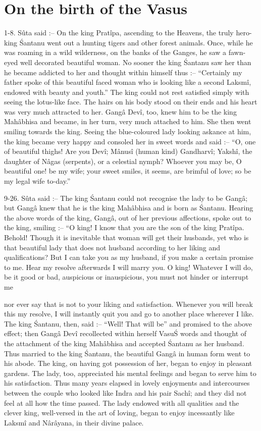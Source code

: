 ﻿\chapter{On the birth of the Vasus}

1-8. S\^uta said :-- On the king Prat\^ipa, ascending to the Heavens, the truly hero-king \'Santanu went out a hunting tigers and other forest animals. Once, while he was roaming in a wild wilderness, on the banks of the Ganges, he saw a fawn-eyed well decorated beautiful woman. No sooner the king \'Santanu saw her than he became addicted to her and thought within himself thus :-- ``Certainly my father spoke of this beautiful faced woman who is looking like a second Laksm\^i, endowed with beauty and youth.'' The king could not rest satisfied simply with seeing the lotus-like face. The hairs on his body stood on their ends and his heart was very much attracted to her. Gang\^a Dev\^i, too, knew him to be the king Mah\^abhisa and became, in her turn, very much attached to him. She then went smiling towards the king. Seeing the blue-coloured lady looking askance at him, the king became very happy and consoled her in sweet words and said :-- ``O, one of beautiful thighs! Are you Dev\^i; M\^anus\^i (human kind) Gandharv\^i; Yaksh\^i, the daughter of N\^agas (serpents), or a celestial nymph? Whoever you may be, O beautiful one! be my wife; your sweet smiles, it seems, are brimful of love; so be my legal wife to-day.''

9-26. S\^uta said :-- The king \'Santanu could not recognise the lady to be Gang\^a; but Gang\^a knew that he is the king Mah\^abhisa and is born as \'Santanu. Hearing the above words of the king, Gang\^a, out of her previous affections, spoke out to the king, smiling :-- ``O king! I know that you are the son of the king Prat\^ipa. Behold! Though it is inevitable that woman will get their husbands, yet who is that beautiful lady that does not husband according to her liking and qualifications? But I can take you as my husband, if you make a certain promise to me. Hear my resolve afterwards I will marry you. O king! Whatever I will do, be it good or bad, auspicious or inauspicious, you must not hinder or interrupt me

nor ever say that is not to your liking and satisfaction. Whenever you will break this my resolve, I will instantly quit you and go to another place wherever I like. The king \'Santanu, then, said :-- ``Well! That will be'' and promised to the above effect; then Gang\^a Dev\^i recollected within herself Vasu\'S words and thought of the attachment of the king Mah\^abhisa and accepted \'Santanu as her husband. Thus married to the king \'Santanu, the beautiful Gang\^a in human form went to his abode. The king, on having got possession of her, began to enjoy in pleasant gardens. The lady, too, appreciated his mental feelings and began to serve him to his satisfaction. Thus many years elapsed in lovely enjoyments and intercourses between the couple who looked like Indra and his pair Sach\^i; and they did not feel at all how the time passed. The lady endowed with all qualities and the clever king, well-versed in the art of loving, began to enjoy incessantly like Laksm\^i and N\^ar\^ayana, in their divine palace.

